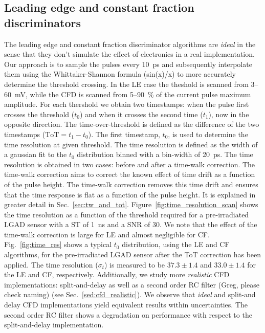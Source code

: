 \documentclass[preprint,1p]{elsarticle}
\begin{document}
\subsection{Leading edge and constant fraction discriminators}\label{sec:le_and_cfd}
The leading edge and constant fraction discriminator algorithms are \textit{ideal} in the sense that they don't simulate the effect of
electronics in a real implementation. Our approach is to sample the pulses every 10~\si{ps} and subsequently interpolate them
using the Whittaker-Shannon formula (sin(x)/x) to more accurately determine the threshold crossing. In the LE case the theshold is scanned
from 3--60~\si{mV}, while the CFD is scanned from 5--90~\% of the current pulse maximum amplitude. For each thershold we obtain two
timestamps: when the pulse first crosses the threshold ($t_{0}$) and when it crosses the second time ($t_{1}$), now in the opposite
direction. The time-over-threshold is defined as the difference of the two timestamps ($\mathrm{ToT} = t_{1} - t_{0}$). The first
timestamp, $t_{0}$, is used to determine the time resolution at given threshold. The time resolution is defined as the width of
a gaussian fit to the $t_{0}$ distribution binned with a bin-width of 20~\si{ps}. The time resolution is obtained in two cases:
before and after a time-walk correction. The time-walk correction aims to correct the known effect of time drift as a function
of the pulse height. The time-walk correction removes this time drift and ensures that the time response is flat as a function
of the pulse height. It is explained in greater detail in Sec.~\ref{sec:tw_and_tot}.
Figure~\ref{fig:time_resolution_scan} shows the time resolution as a function
of the threshold required for a pre-irradiated LGAD sensor with a ST of 1~\si{ns} and a SNR of 30.
We note that the effect of the time-walk correction is large for LE and almost negligible for CF.
Fig.~\ref{fig:time_res} shows a typical $t_{0}$ distribution, using the LE and CF algorithms, for the pre-irradiated
LGAD sensor after the ToT correction has been applied. The time resolution ($\sigma_{t}$) is measured to be $37.3 \pm 1.4 $
and $33.0 \pm 1.4$ for the LE and CF, respectively. Additionally, we study more \textit{realistic} CFD implementations:
{\color{red}split-and-delay as well as a second order RC filter (Greg, please check naming)} (see Sec.~\ref{sed:cfd_realistic}).
 We observe that \textit{ideal} and split-and delay CFD implementations yield equivalent results within uncertainties.
 The second order RC filter shows a degradation on performance with respect to the split-and-delay implementation.
\end{document}
